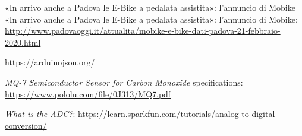 \begin{thebibliography}{00}
 «In arrivo anche a Padova le E-Bike a pedalata assistita»: l'annuncio di Mobike «In arrivo anche a Padova le E-Bike a pedalata assistita»: l'annuncio di Mobike:  \href{http://www.padovaoggi.it/attualita/mobike-e-bike-dati-padova-21-febbraio-2020.html}{http://www.padovaoggi.it/attualita/mobike-e-bike-dati-padova-21-febbraio-2020.html}

https://arduinojson.org/

 \textit{MQ-7 Semiconductor Sensor for Carbon Monoxide} specifications:  \url{https://www.pololu.com/file/0J313/MQ7.pdf }

 \textit{What is the ADC?}:  \url{https://learn.sparkfun.com/tutorials/analog-to-digital-conversion/}
	
\end{thebibliography}
